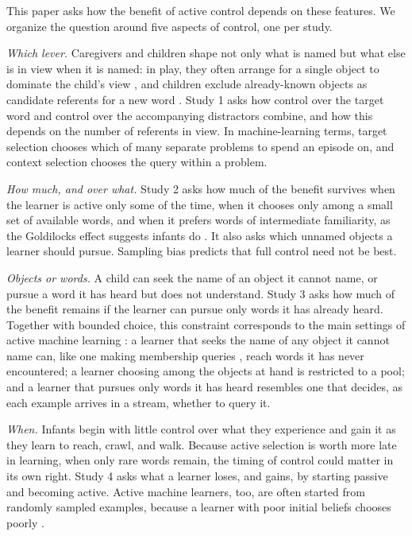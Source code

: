\documentclass[a4paper,natbib,man]{apa6}
\begin{document}
This paper asks how the benefit of active control depends on these features. We organize the question around five aspects of control, one per study.

\textit{Which lever.} Caregivers and children shape not only what is named but what else is in view when it is named: in play, they often arrange for a single object to dominate the child's view \citep{Yu:2009active,Suanda:2018}, and children exclude already-known objects as candidate referents for a new word \citep{Grassmann:2015}. Study 1 asks how control over the target word and control over the accompanying distractors combine, and how this depends on the number of referents in view. In machine-learning terms, target selection chooses which of many separate problems to spend an episode on, and context selection chooses the query within a problem.

\textit{How much, and over what.} Study 2 asks how much of the benefit survives when the learner is active only some of the time, when it chooses only among a small set of available words, and when it prefers words of intermediate familiarity, as the Goldilocks effect suggests infants do \citep{Kidd:2012}. It also asks which unnamed objects a learner should pursue. Sampling bias predicts that full control need not be best.

\textit{Objects or words.} A child can seek the name of an object it cannot name, or pursue a word it has heard but does not understand. Study 3 asks how much of the benefit remains if the learner can pursue only words it has already heard. Together with bounded choice, this constraint corresponds to the main settings of active machine learning \citep{Settles:2012}: a learner that seeks the name of any object it cannot name can, like one making membership queries \citep{Angluin:1988}, reach words it has never encountered; a learner choosing among the objects at hand is restricted to a pool; and a learner that pursues only words it has heard resembles one that decides, as each example arrives in a stream, whether to query it.

\textit{When.} Infants begin with little control over what they experience and gain it as they learn to reach, crawl, and walk. Because active selection is worth more late in learning, when only rare words remain, the timing of control could matter in its own right. Study 4 asks what a learner loses, and gains, by starting passive and becoming active. Active machine learners, too, are often started from randomly sampled examples, because a learner with poor initial beliefs chooses poorly \citep{Settles:2012}.
\end{document}
